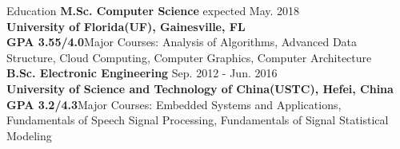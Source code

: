 \documentclass{resume} %
\begin{document}
\vspace{-1.5em}


\begin{rSection}{Education}
{\bf M.Sc. Computer Science} \hfill {expected May. 2018}\\
{\bf University of Florida(UF), Gainesville, FL}\\
{\bf GPA 3.55/4.0}{\qquad Major Courses: Analysis of Algorithms, Advanced Data Structure, Cloud Computing, Computer Graphics, Computer Architecture}\vspace{0.4em}\\
{\bf B.Sc. Electronic Engineering  } \hfill { Sep. 2012 - Jun. 2016} \\
{\bf University of Science and Technology of China(USTC), Hefei, China} \\
{\bf GPA 3.2/4.3}{\qquad Major Courses: Embedded Systems and Applications, Fundamentals of Speech Signal Processing, Fundamentals of Signal Statistical Modeling}
\end{rSection}


\end{document}
